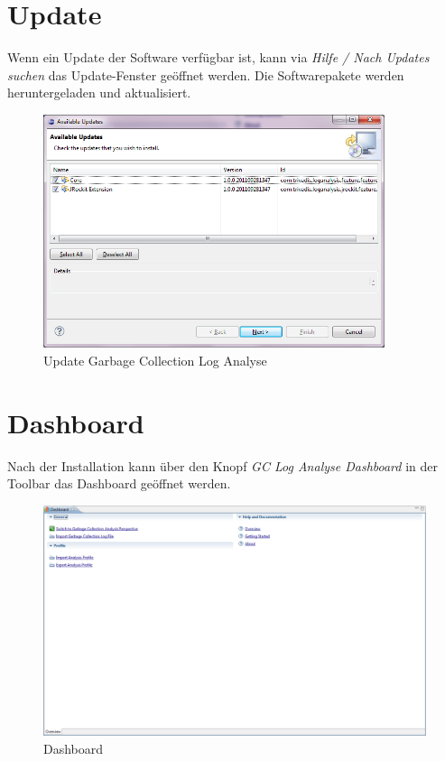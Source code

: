 \section*{Update}
Wenn ein Update der Software verfügbar ist, kann via \textit{Hilfe / Nach Updates suchen} das Update-Fenster geöffnet werden. Die  Softwarepakete werden heruntergeladen und aktualisiert.
 \begin{figure}[H]
  	\centering
    	\includegraphics[width=10cm]{images/tutorial_update01}
        	\caption{Update Garbage Collection Log Analyse}
\end{figure}

\section*{Dashboard}
Nach der Installation kann über den Knopf \textit{GC Log Analyse Dashboard} in der Toolbar das Dashboard geöffnet werden. 
 \begin{figure}[H]
  	\centering
    	\includegraphics[width=16cm]{images/tutorial_dashboard}
        	\caption{Dashboard}
\end{figure}

